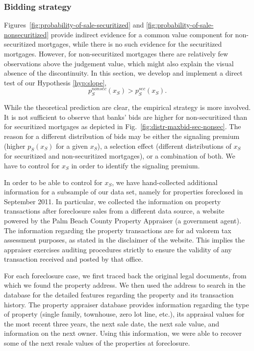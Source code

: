 \documentclass[11pt,twopage]{article}
\begin{document}

\subsubsection{Bidding strategy}

Figures~\ref{fig:probability-of-sale-securitized} and
\ref{fig:probability-of-sale-nonsecuritized} provide indirect evidence
for a common value component for non-securitized mortgages, while there is no such evidence for the securitized mortgages. However, for non-securitized mortgages there are relatively few observations above the judgement value, which might also explain the visual absence of the discontinuity. In this section, we develop and implement a direct test of our Hypothesis \ref{hyp:slope},
\[ p_S^{nonsec}(x_S) > p_S^{sec}(x_S).\]

While the theoretical prediction are clear, the empirical strategy is more involved. It is not sufficient to observe that
banks' bids are higher for non-securitized than for securitized mortgages as depicted in Fig.~\ref{fig:distr-maxbid-sec-nonsec}. The reason for a different distribution of bids may
be either the signaling premium (higher $p_S(x_S)$ for a given $x_S$), a selection effect (different distributions
of $x_S$ for securitized and non-securitized mortgages), or a combination of both. We have to control for $x_S$ in order to
identify the signaling premium.


In order to be able to control for $x_S$, we have hand-collected additional information for a subsample of our data set, namely for properties foreclosed in September 2011. In particular, we collected the information on property transactions after foreclosure sales from a different data source, a website powered by the Palm Beach County Property Appraiser (a government agent). The information regarding the property transactions are for ad valorem tax assessment purposes, as stated in the disclaimer of the website. This implies the appraiser exercises auditing procedures strictly to ensure the validity of any transaction received and posted by that office.

For each foreclosure case, we first traced back the original legal documents, from which we found the property address. We then used the address to search in the database for the detailed features regarding the property and its transaction history. The property appraiser database provides information regarding the type of property (single family, townhouse, zero lot line, etc.), its appraisal values for the most recent three years, the next sale date, the next sale value, and information on the next owner. Using this information, we were able to recover some of the next resale values of the properties at foreclosure.
\end{document}
